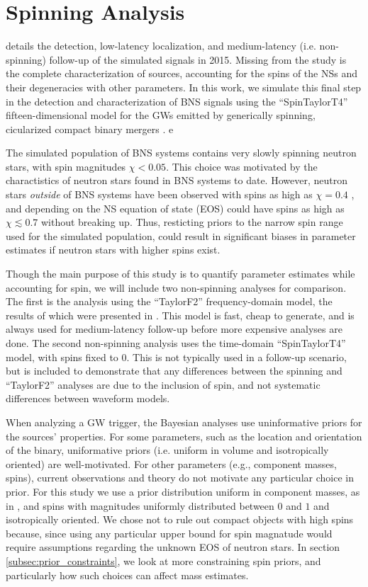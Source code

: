 \section{Spinning Analysis}
\label{sec:spin}

\citet{Singer_2014} details the detection, low-latency localization, and medium-latency (i.e. non-spinning) follow-up of the simulated signals in 2015.  Missing from the study is the complete characterization of sources, accounting for the spins of the NSs and their degeneracies with other parameters.  In this work, we simulate this final step in the detection and characterization of BNS signals using the ``SpinTaylorT4'' fifteen-dimensional model for the GWs emitted by generically spinning, cicularized compact binary mergers \citep{Buonanno_2003,Buonanno_2009}. e

The simulated population of BNS systems contains very slowly spinning neutron stars, with spin magnitudes $\chi < 0.05$.  This choice was motivated by the charactistics of neutron stars found in BNS systems to date. However, neutron stars \emph{outside} of BNS systems have been observed with spins as high as $\chi = 0.4$ \citep{Hessels_2006,Brown_2012}, and depending on the NS equation of state (EOS) could have spins as high as $\chi \lesssim 0.7$ \citep{Lo_2011} without breaking up.  Thus, resticting priors to the narrow spin range used for the simulated population, could result in significant biases in parameter estimates if neutron stars with higher spins exist.

Though the main purpose of this study is to quantify parameter estimates while accounting for spin, we will include two non-spinning analyses for comparison.  The first is the analysis using the ``TaylorF2'' frequency-domain model, the results of which were presented in \citet{Singer_2014}.  This model is fast, cheap to generate, and is always used for medium-latency follow-up before more expensive analyses are done.  The second non-spinning analysis uses the time-domain ``SpinTaylorT4'' model, with spins fixed to $0$.  This is not typically used in a follow-up scenario, but is included to demonstrate that any differences between the spinning and ``TaylorF2'' analyses are due to the inclusion of spin, and not systematic differences between waveform models.

When analyzing a GW trigger, the Bayesian analyses use uninformative priors for the sources' properties.  For some parameters, such as the location and orientation of the binary, uniformative priors (i.e. uniform in volume and isotropically oriented) are well-motivated.  For other parameters (e.g., component masses, spins), current observations and theory do not motivate any particular choice in prior.  For this study we use a prior distribution uniform in component masses, as in \citet{2013arXiv1304.0670L}, and spins with magnitudes uniformly distributed between $0$ and $1$ and isotropically oriented.  We chose not to rule out compact objects with high spins because, since using any particular upper bound for spin magnatude would require assumptions regarding the unknown EOS of neutron stars.  In section \ref{subsec:prior_constraints}, we look at more constraining spin priors, and particularly how such choices can affect mass estimates.